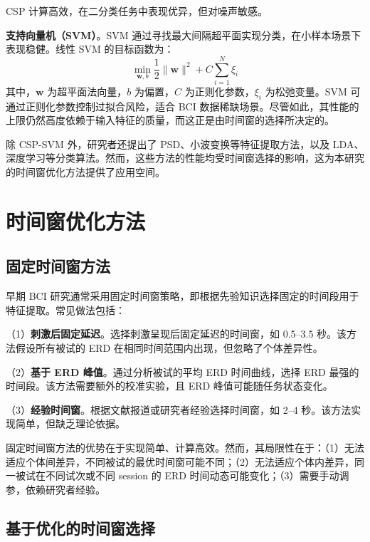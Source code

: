 CSP 计算高效，在二分类任务中表现优异，但对噪声敏感\cite{lotte2011regularizing}。

\textbf{支持向量机（SVM）}。SVM 通过寻找最大间隔超平面实现分类，在小样本场景下表现稳健\cite{lotte2007review}。线性 SVM 的目标函数为：
\begin{equation}
\min_{\mathbf{w}, b} \frac{1}{2} \|\mathbf{w}\|^2 + C \sum_{i=1}^N \xi_i
\end{equation}
其中，$\mathbf{w}$ 为超平面法向量，$b$ 为偏置，$C$ 为正则化参数，$\xi_i$ 为松弛变量。SVM 可通过正则化参数控制过拟合风险，适合 BCI 数据稀缺场景。尽管如此，其性能的上限仍然高度依赖于输入特征的质量，而这正是由时间窗的选择所决定的。

除 CSP-SVM 外，研究者还提出了 PSD、小波变换等特征提取方法，以及 LDA、深度学习等分类算法\cite{lotte2007review}。然而，这些方法的性能均受时间窗选择的影响，这为本研究的时间窗优化方法提供了应用空间。

\section{时间窗优化方法}
\label{sec:time_window_optimization}

\subsection{固定时间窗方法}
\label{subsec:fixed_window}

早期 BCI 研究通常采用固定时间窗策略，即根据先验知识选择固定的时间段用于特征提取\cite{lotte2007review}。常见做法包括：

（1）\textbf{刺激后固定延迟}。选择刺激呈现后固定延迟的时间窗，如 0.5--3.5 秒\cite{tangermann2012review}。该方法假设所有被试的 ERD 在相同时间范围内出现，但忽略了个体差异性。

（2）\textbf{基于 ERD 峰值}。通过分析被试的平均 ERD 时间曲线，选择 ERD 最强的时间段\cite{pfurtscheller1999event}。该方法需要额外的校准实验，且 ERD 峰值可能随任务状态变化。

（3）\textbf{经验时间窗}。根据文献报道或研究者经验选择时间窗，如 2--4 秒\cite{lotte2007review}。该方法实现简单，但缺乏理论依据。

固定时间窗方法的优势在于实现简单、计算高效。然而，其局限性在于：（1）无法适应个体间差异，不同被试的最优时间窗可能不同；（2）无法适应个体内差异，同一被试在不同试次或不同 session 的 ERD 时间动态可能变化；（3）需要手动调参，依赖研究者经验\cite{lotte2011regularizing}。

\subsection{基于优化的时间窗选择}
\label{subsec:optimization_based}

